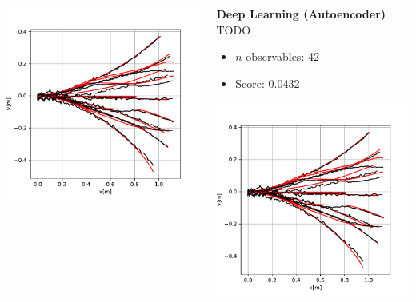 \documentclass[shortpres,aspectratio=43]{beamer}
\begin{document}
\begin{frame}
\begin{columns}
\begin{column}{0.32\linewidth}
\begin{center}
		\includegraphics[width=0.8\linewidth]{./img/predictions_both.pdf}
		\end{center}
	\end{column}
	\begin{column}{0.32\linewidth}
		\small
		\textbf{Deep Learning (Autoencoder)}
		TODO
		\begin{itemize}
			\item $n$ observables: 42
			\item Score: 0.0432
		\end{itemize}
		\begin{center}
		\includegraphics[width=0.8\linewidth]{./img/predictions_both.pdf}
		\end{center}
	\end{column}
\end{columns}


\end{frame}
\end{document}
